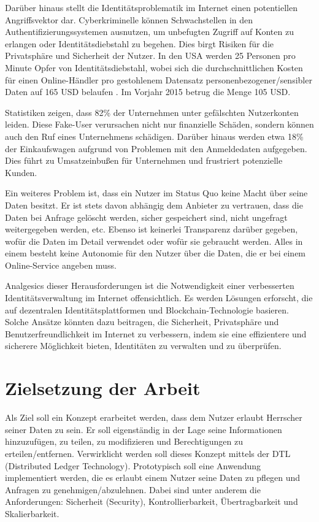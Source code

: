 Darüber hinaus stellt die Identitätsproblematik im Internet einen potentiellen Angriffsvektor dar. Cyberkriminelle können Schwachstellen in den Authentifizierungssystemen ausnutzen, um unbefugten Zugriff auf Konten zu erlangen oder Identitätsdiebstahl zu begehen. Dies birgt Risiken für die Privatsphäre und Sicherheit der Nutzer. In den USA werden 25 Personen pro Minute Opfer von Identitätsdiebstahl, wobei sich die durchschnittlichen Kosten für einen Online-Händler pro gestohlenem Datensatz personenbezogener/sensibler Daten auf 165 USD belaufen \cite{ID10}. Im Vorjahr 2015 betrug die Menge 105 USD.

Statistiken \cite{ID11} zeigen, dass 82\% der Unternehmen unter gefälschten Nutzerkonten leiden. Diese Fake-User verursachen nicht nur finanzielle Schäden, sondern können auch den Ruf eines Unternehmens schädigen. Darüber hinaus werden etwa 18\% der Einkaufswagen aufgrund von Problemen mit den Anmeldedaten aufgegeben. Dies führt zu Umsatzeinbußen für Unternehmen und frustriert potenzielle Kunden.

Ein weiteres Problem ist, dass ein Nutzer im Status Quo keine Macht über seine Daten besitzt. Er ist stets davon abhängig dem Anbieter zu vertrauen, dass die Daten bei Anfrage gelöscht werden, sicher gespeichert sind, nicht ungefragt weitergegeben werden, etc. Ebenso ist keinerlei Transparenz darüber gegeben, wofür die Daten im Detail verwendet oder wofür sie gebraucht werden. Alles in einem besteht keine Autonomie für den Nutzer über die Daten, die er bei einem Online-Service angeben muss.

Analgesics dieser Herausforderungen ist die Notwendigkeit einer verbesserten Identitätsverwaltung im Internet offensichtlich. Es werden Lösungen erforscht, die auf dezentralen Identitätsplattformen und Blockchain-Technologie basieren. Solche Ansätze könnten dazu beitragen, die Sicherheit, Privatsphäre und Benutzerfreundlichkeit im Internet zu verbessern, indem sie eine effizientere und sicherere Möglichkeit bieten, Identitäten zu verwalten und zu überprüfen.

\section{Zielsetzung der Arbeit}
\label{zielsetzung}
Als Ziel soll ein Konzept erarbeitet werden, dass dem Nutzer erlaubt Herrscher seiner
Daten zu sein. Er soll eigenständig in der Lage seine Informationen hinzuzufügen, zu
teilen, zu modifizieren und Berechtigungen zu erteilen/entfernen. Verwirklicht werden
soll dieses Konzept mittels der DTL (Distributed Ledger Technology). Prototypisch
soll eine Anwendung implementiert werden, die es erlaubt einem Nutzer seine Daten
zu pflegen und Anfragen zu genehmigen/abzulehnen. Dabei sind unter anderem die
Anforderungen: Sicherheit (Security), Kontrollierbarkeit, Übertragbarkeit und Skalierbarkeit.

